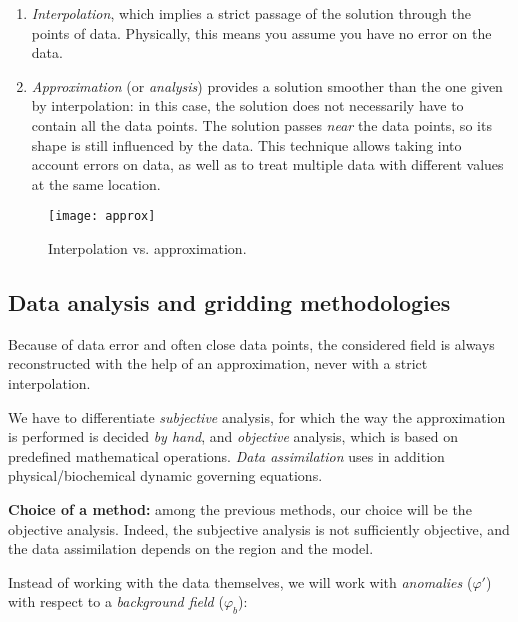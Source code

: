 \begin{enumerate}

\item \textit{Interpolation}, which implies a strict passage of the solution through the points of data. Physically, this means you assume you have no error on the data. 


\item \textit{Approximation} (or \textit{analysis}) provides a solution smoother than the one given by interpolation: in this case, the solution does not necessarily have to contain all the data points. The solution passes \textsl{near} the data points, so its shape is still influenced by the data. This technique allows taking into account errors on data, as well as to treat multiple data with different values at the same location. 
\end{enumerate}

\begin{figure}[htpb]
	\centering
	\parbox{.5\textwidth}{
		\texttt{[image: approx]}
		}\parbox{.5\textwidth}{
		\caption{Interpolation vs. approximation.}
		}
\end{figure}


\subsection{Data analysis and gridding methodologies\label{sec:gridding}}

Because of data error and often close data points, the considered field is always reconstructed with the help of an approximation, never with a strict interpolation. 

We have to differentiate \textit{subjective} analysis, for which the way the approximation is performed is decided \textit{by hand}, and \textit{objective} analysis, which is based on predefined mathematical operations. \textit{Data assimilation} uses in addition physical/biochemical dynamic governing equations.

\textbf{Choice of a method:} among the previous methods, our choice will be the objective analysis. Indeed, the subjective analysis is not sufficiently objective, and the data assimilation depends on the region and the model.

Instead of working with the data themselves, we will work with \textit{anomalies} ($\varphi'$) with respect to a \textit{background field} ($\varphi_b$):

